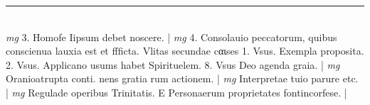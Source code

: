 \documentclass{article}
\begin{document}
\begin{pages}
\vspace{0.5cm}\noindent
\vspace{0.2cm}\rule{1cm}{0.2pt}\\ 
\hspace{0.2cm}\textit{mg}
\footnotesize 3. Homofe Iipsum debet noscere. 
\normalsize| 
\hspace{0.2cm}\textit{mg}
\footnotesize 4. Consolauio peccatorum, quibus conscienua lauxia est et ffficta. Vlitas secundae cαιses 1. Vsus. Exempla proposita. 2. Vsus. Applicano usums habet Spirituelem. 8. Vsus Deo agenda graia. 
\normalsize| 
\hspace{0.2cm}\textit{mg}
\footnotesize Oranioatrupta conti. nens gratia rum actionem. 
\normalsize| 
\hspace{0.2cm}\textit{mg}
\footnotesize Interpretae tuio parure etc. 
\normalsize| 
\hspace{0.2cm}\textit{mg}
\footnotesize Regulade operibus Trinitatis. E Personaerum proprietates fontincorfese. 
\normalsize| 

\end{pages}
\end{document}
